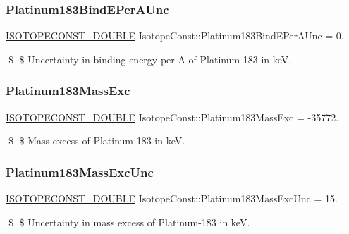 \subsubsection{\texorpdfstring{Platinum183\+Bind\+E\+Per\+A\+Unc}{Platinum183BindEPerAUnc}}
{\footnotesize\ttfamily \mbox{\hyperlink{group___isotope_const-_macros_ga8f45a7272ce02c0b4c65c44636ed719a}{I\+S\+O\+T\+O\+P\+E\+C\+O\+N\+S\+T\+\_\+\+D\+O\+U\+B\+LE}} Isotope\+Const\+::\+Platinum183\+Bind\+E\+Per\+A\+Unc = 0.}

\$ \$ Uncertainty in binding energy per A of Platinum-\/183 in keV. \mbox{\label{group___isotope_const-_platinum-_pt183_ga36fa5d45ec2da3241c4a5802150f57a1}} 
\subsubsection{\texorpdfstring{Platinum183\+Mass\+Exc}{Platinum183MassExc}}
{\footnotesize\ttfamily \mbox{\hyperlink{group___isotope_const-_macros_ga8f45a7272ce02c0b4c65c44636ed719a}{I\+S\+O\+T\+O\+P\+E\+C\+O\+N\+S\+T\+\_\+\+D\+O\+U\+B\+LE}} Isotope\+Const\+::\+Platinum183\+Mass\+Exc = -\/35772.}

\$ \$ Mass excess of Platinum-\/183 in keV. \mbox{\label{group___isotope_const-_platinum-_pt183_ga8449228fc1b1aa36a0a1a39cbf65c5b9}} 
\subsubsection{\texorpdfstring{Platinum183\+Mass\+Exc\+Unc}{Platinum183MassExcUnc}}
{\footnotesize\ttfamily \mbox{\hyperlink{group___isotope_const-_macros_ga8f45a7272ce02c0b4c65c44636ed719a}{I\+S\+O\+T\+O\+P\+E\+C\+O\+N\+S\+T\+\_\+\+D\+O\+U\+B\+LE}} Isotope\+Const\+::\+Platinum183\+Mass\+Exc\+Unc = 15.}

\$ \$ Uncertainty in mass excess of Platinum-\/183 in keV. \mbox{\label{group___isotope_const-_platinum-_pt183_ga1d99c45b9b8c89c2d433d1ae602dc820}} 
